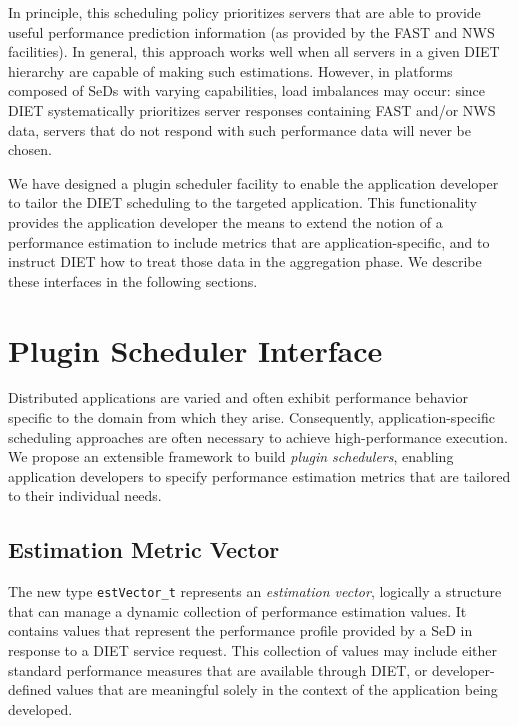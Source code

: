 In principle, this scheduling policy prioritizes servers that are able
to provide useful performance prediction information (as provided by
the FAST and NWS facilities).  In general, this approach works well
when all servers in a given DIET hierarchy are capable of making such
estimations.  However, in platforms composed of SeDs with varying
capabilities, load imbalances may occur: since DIET systematically
prioritizes server responses containing FAST and/or NWS data, servers
that do not respond with such performance data will never be
chosen.

We have designed a plugin scheduler facility to
enable the application developer to tailor the DIET scheduling to the
targeted application.
This functionality provides
the application developer the means to extend the notion of a
performance estimation to include metrics that are
application-specific, and to instruct DIET how to treat those data in
the aggregation phase.
We describe these interfaces in the following sections.


\section{Plugin Scheduler Interface}

Distributed applications are varied and often exhibit performance
behavior specific to the domain from which they arise.  Consequently,
application-specific scheduling approaches are often necessary to
achieve high-performance execution.  We propose an extensible
framework to build
\emph{plugin schedulers}, enabling application developers to specify
performance estimation metrics that are tailored to their individual
needs.


\subsection{Estimation Metric Vector}\label{sect:estvector}

The new type \texttt{estVector\_t} represents an
\emph{estimation vector}, logically a structure that can manage a
dynamic collection of performance estimation values.  It contains
values that represent the performance profile provided by a
SeD in response to a DIET service request.  This collection of values
may include either standard performance measures that are available
through DIET, or developer-defined values that are meaningful solely in
the context of the application being developed.

